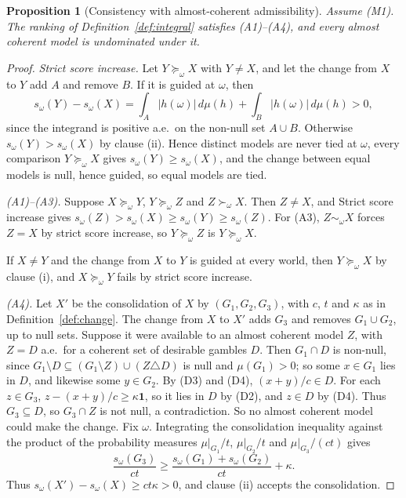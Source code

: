 \documentclass[11pt]{article}
\newtheorem{proposition}[theorem]{Proposition}
\theoremstyle{definition}
\newcommand{\one}{\mathbf 1}
\begin{document}
\begin{proposition}[Consistency with almost-coherent admissibility]\label{prop:consistent}
Assume (M1). The ranking of Definition~\ref{def:integral} satisfies (A1)--(A4), and every almost coherent model is undominated under it.
\end{proposition}
\begin{proof}
\emph{Strict score increase.} Let $Y\succeq_\omega X$ with $Y\ne X$, and let the change from $X$ to $Y$ add $A$ and remove $B$. If it is guided at $\omega$, then
\[
s_\omega(Y)-s_\omega(X)=\int_A|h(\omega)|\,d\mu(h)+\int_B|h(\omega)|\,d\mu(h)>0,
\]
since the integrand is positive a.e.\ on the non-null set $A\cup B$. Otherwise $s_\omega(Y)>s_\omega(X)$ by clause (ii). Hence distinct models are never tied at $\omega$, every comparison $Y\succeq_\omega X$ gives $s_\omega(Y)\ge s_\omega(X)$, and the change between equal models is null, hence guided, so equal models are tied.

\emph{(A1)--(A3).} Suppose $X\succeq_\omega Y$, $Y\succeq_\omega Z$ and $Z\succ_\omega X$. Then $Z\ne X$, and Strict score increase gives $s_\omega(Z)>s_\omega(X)\ge s_\omega(Y)\ge s_\omega(Z)$. For (A3), $Z\sim_\omega X$ forces $Z=X$ by strict score increase, so $Y\succeq_\omega Z$ is $Y\succeq_\omega X$.

If $X\ne Y$ and the change from $X$ to $Y$ is guided at every world, then $Y\succeq_\omega X$ by clause (i), and $X\succeq_\omega Y$ fails by strict score increase.

\emph{(A4).} Let $X'$ be the consolidation of $X$ by $(G_1,G_2,G_3)$, with $c$, $t$ and $\kappa$ as in Definition~\ref{def:change}. The change from $X$ to $X'$ adds $G_3$ and removes $G_1\cup G_2$, up to null sets. Suppose it were available to an almost coherent model $Z$, with $Z=D$ a.e.\ for a coherent set of desirable gambles $D$. Then $G_1\cap D$ is non-null, since $G_1\setminus D\subseteq(G_1\setminus Z)\cup(Z\triangle D)$ is null and $\mu(G_1)>0$; so some $x\in G_1$ lies in $D$, and likewise some $y\in G_2$. By (D3) and (D4), $(x+y)/c\in D$. For each $z\in G_3$, $z-(x+y)/c\ge\kappa\one$, so it lies in $D$ by (D2), and $z\in D$ by (D4). Thus $G_3\subseteq D$, so $G_3\cap Z$ is not null, a contradiction. So no almost coherent model could make the change. Fix $\omega$. Integrating the consolidation inequality against the product of the probability measures
$\mu|_{G_1}/t$, $\mu|_{G_2}/t$ and $\mu|_{G_3}/(ct)$ gives
\[
 \frac{s_\omega(G_3)}{ct}\ge
 \frac{s_\omega(G_1)+s_\omega(G_2)}{ct}+\kappa.
\]
Thus $s_\omega(X')-s_\omega(X)\ge ct\kappa>0$, and clause (ii) accepts the consolidation.



\end{proof}
\end{document}
